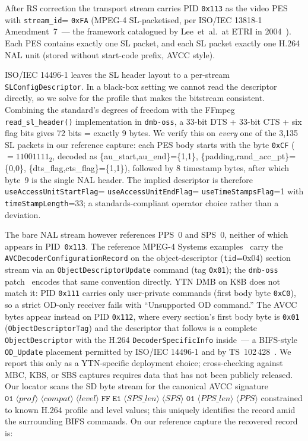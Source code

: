 \documentclass[conference,letterpaper,10pt]{IEEEtran}
\begin{document}
After RS correction the transport stream carries PID
\texttt{0x113} as the video PES with \texttt{stream\_id}=
\texttt{0xFA} (MPEG-4 SL-packetised, per ISO/IEC 13818-1
Amendment~7~--- the framework catalogued by Lee~et~al.~at
ETRI in 2004~\cite{lee2004m4smux}).  Each PES contains exactly
one SL packet, and each SL packet exactly one H.264 NAL unit
(stored without start-code prefix, AVCC style).

ISO/IEC 14496-1 leaves the SL header layout to a per-stream
\texttt{SLConfigDescriptor}.  In a black-box setting we cannot
read the descriptor directly, so we solve for the profile that
makes the bitstream consistent.  Combining the standard's
degrees of freedom with the FFmpeg \texttt{read\_sl\_header()}
implementation in \texttt{dmb-oss}, a 33-bit DTS + 33-bit CTS
+ six flag bits gives 72 bits = exactly 9 bytes.  We verify this
on \emph{every} one of the 3{,}135 SL packets in our reference
capture: each PES body starts with the byte \texttt{0xCF}
($=11001111_2$, decoded as
\{au\_start,au\_end\}=\{1,1\},
\{padding,rand\_acc\_pt\}=\{0,0\},
\{dts\_flag,cts\_flag\}=\{1,1\}), followed by 8 timestamp bytes,
after which byte~9 is the single NAL header.  The implied
descriptor is therefore
\texttt{useAccessUnitStartFlag}=
\texttt{useAccessUnitEndFlag}=
\texttt{useTimeStampsFlag}=1
with \texttt{timeStampLength}=33; a standards-compliant operator
choice rather than a deviation.

The bare NAL stream however references PPS~0 and SPS~0, neither
of which appears in PID~\texttt{0x113}.  The reference MPEG-4
Systems examples~\cite{iso14496-1} carry the
\texttt{AVCDecoderConfigurationRecord} on the object-descriptor
(\texttt{tid}=0x04) section stream via an
\texttt{ObjectDescriptorUpdate} command (tag \texttt{0x01}); the
\texttt{dmb-oss} patch~\cite{eo2024tdmb} encodes that same
convention directly.  YTN DMB on K8B does not match it: PID
\texttt{0x111} carries only user-private commands (first body
byte \texttt{0xC0}), so a strict OD-only receiver fails with
``Unsupported OD command.''  The AVCC bytes appear instead on
PID \texttt{0x112}, where every section's first body byte is
\texttt{0x01} (\texttt{ObjectDescriptorTag}) and the descriptor
that follows is a complete \texttt{ObjectDescriptor} with the
H.264 \texttt{DecoderSpecificInfo} inside~--- a BIFS-style
\texttt{OD\_Update} placement permitted by ISO/IEC 14496-1 and
by TS~102\,428~\cite{etsi102428}.  We report this only as a
YTN-specific deployment choice; cross-checking against MBC, KBS,
or SBS captures requires data that has not been publicly
released.  Our locator scans the SD byte stream for the
canonical AVCC signature
$\texttt{01}\;\langle\textit{prof}\rangle\;\langle\textit{compat}\rangle
   \;\langle\textit{level}\rangle\;\texttt{FF}\;\texttt{E1}\;
   \langle\textit{SPS\_len}\rangle\;\langle\textit{SPS}\rangle\;
   \texttt{01}\;\langle\textit{PPS\_len}\rangle\;\langle\textit{PPS}\rangle$
constrained to known H.264 profile and level values; this
uniquely identifies the record amid the surrounding BIFS
commands.  On our reference capture the recovered record is:
\end{document}

